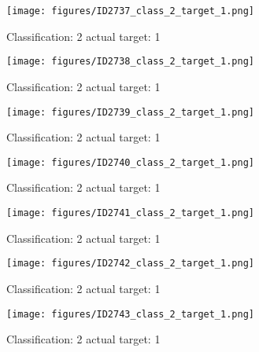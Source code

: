 \begin{figure}[h!]
\begin{center}
\texttt{[image: figures/ID2737\_class\_2\_target\_1.png]}
\end{center}
\caption{ Classification: 2 actual target: 1}
\label{fig:ID2737_class_2_target_1}
\end{figure}
\begin{figure}[h!]
\begin{center}
\texttt{[image: figures/ID2738\_class\_2\_target\_1.png]}
\end{center}
\caption{ Classification: 2 actual target: 1}
\label{fig:ID2738_class_2_target_1}
\end{figure}
\begin{figure}[h!]
\begin{center}
\texttt{[image: figures/ID2739\_class\_2\_target\_1.png]}
\end{center}
\caption{ Classification: 2 actual target: 1}
\label{fig:ID2739_class_2_target_1}
\end{figure}
\begin{figure}[h!]
\begin{center}
\texttt{[image: figures/ID2740\_class\_2\_target\_1.png]}
\end{center}
\caption{ Classification: 2 actual target: 1}
\label{fig:ID2740_class_2_target_1}
\end{figure}
\begin{figure}[h!]
\begin{center}
\texttt{[image: figures/ID2741\_class\_2\_target\_1.png]}
\end{center}
\caption{ Classification: 2 actual target: 1}
\label{fig:ID2741_class_2_target_1}
\end{figure}
\begin{figure}[h!]
\begin{center}
\texttt{[image: figures/ID2742\_class\_2\_target\_1.png]}
\end{center}
\caption{ Classification: 2 actual target: 1}
\label{fig:ID2742_class_2_target_1}
\end{figure}
\begin{figure}[h!]
\begin{center}
\texttt{[image: figures/ID2743\_class\_2\_target\_1.png]}
\end{center}
\caption{ Classification: 2 actual target: 1}
\label{fig:ID2743_class_2_target_1}
\end{figure}
